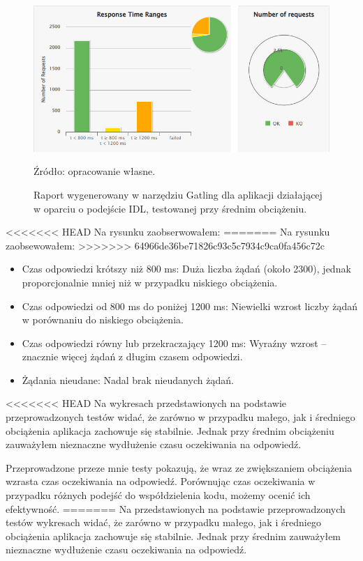 \documentclass[runningheads,12pt]{llncs}
\begin{document}
\begin{figure}
    \includegraphics[width=\linewidth]{images/idl-midle-gatling-graph.jpg}
    \caption{Raport wygenerowany w narzędziu Gatling dla aplikacji działającej w oparciu o podejście IDL, testowanej przy średnim obciążeniu.} \label{fig1}
    \vspace{0.5em}
    {\small Źródło: opracowanie własne.}
\end{figure}

<<<<<<< HEAD
Na rysunku zaobserwowałem:
=======
Na rysunku zaobsewowałem:
>>>>>>> 64966de36be71826c93c5c7934c9ca0fa456c72c

\begin{itemize}
    \item Czas odpowiedzi krótszy niż 800 ms: Duża liczba żądań (około 2300), jednak proporcjonalnie mniej niż w przypadku niskiego obciążenia.
    \item Czas odpowiedzi od 800 ms do poniżej 1200 ms: Niewielki wzrost liczby żądań w porównaniu do niskiego obciążenia.
    \item Czas odpowiedzi równy lub przekraczający 1200 ms: Wyraźny wzrost – znacznie więcej żądań z długim czasem odpowiedzi.
    \item Żądania nieudane: Nadal brak nieudanych żądań.
\end{itemize}

<<<<<<< HEAD
Na wykresach przedstawionych na podstawie przeprowadzonych testów widać, że zarówno w przypadku małego, jak i średniego obciążenia aplikacja zachowuje się stabilnie. Jednak przy średnim obciążeniu zauważyłem nieznaczne wydłużenie czasu oczekiwania na odpowiedź.

\newpage

Przeprowadzone przeze mnie testy pokazują, że wraz ze zwiększaniem obciążenia wzrasta czas oczekiwania na odpowiedź. Porównując czas oczekiwania w przypadku różnych podejść do współdzielenia kodu, możemy ocenić ich efektywność.
=======
Na przedstawionych na podstawie przeprowadzonych testów wykresach widać, że zarówno w przypadku małego, jak i średniego obciążenia aplikacja zachowuje się stabilnie. Jednak przy średnim zauważyłem nieznaczne wydłużenie czasu oczekiwania na odpowiedź.
\end{document}
